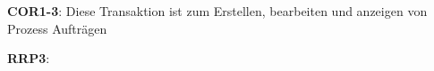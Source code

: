 \textbf{COR1-3}:
\linebreak
	Diese Transaktion ist zum Erstellen, bearbeiten und anzeigen von Prozess Aufträgen

\textbf{RRP3}:

